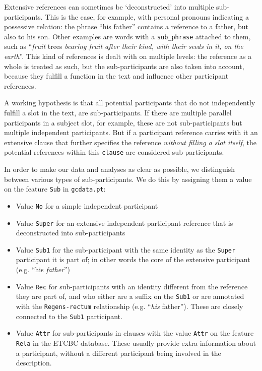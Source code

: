 \documentclass{report}
\newcommand{\mi}[1]{\lstinline{#1}}
\begin{document}
Extensive references can sometimes be `deconstructed' into multiple sub-participants. This is the case, for example, with personal pronouns indicating a possessive relation: the phrase ``his father'' contains a reference to a father, but also to his son. Other examples are words with a \mi{sub_phrase} attached to them, such as ``\emph{fruit} trees \emph{bearing fruit after their kind, with their seeds in it, on the earth}''. This kind of references is dealt with on multiple levels: the reference as a whole is treated as such, but the sub-participants are also taken into account, because they fulfill a function in the text and influence other participant references.

A working hypothesis is that all potential participants that do not independently fulfill a slot in the text, are sub-participants. If there are multiple parallel participants in a subject slot, for example, these are not sub-participants but multiple independent participants. But if a participant reference carries with it an extensive clause that further specifies the reference \emph{without filling a slot itself}, the potential references within this \mi{clause} are considered sub-participants.

In order to make our data and analyses as clear as possible, we distinguish between various types of sub-participants. We do this by assigning them a value on the feature \mi{Sub} in \mi{gcdata.pt}:
\begin{itemize}
\item Value \mi{No} for a simple independent participant
\item Value \mi{Super} for an extensive independent participant reference that is deconstructed into sub-participants
\item Value \mi{Sub1} for the sub-participant with the same identity as the \mi{Super} participant it is part of; in other words the core of the extensive participant (e.g. ``his \emph{father}'')
\item Value \mi{Rec} for sub-participants with an identity different from the reference they are part of, and who either are a suffix on the \mi{Sub1} or are annotated with the \mi{Regens-rectum} relationship (e.g. ``\emph{his} father''). These are closely connected to the \mi{Sub1} participant.
\item Value \mi{Attr} for sub-participants in clauses with the value \mi{Attr} on the feature \mi{Rela} in the ETCBC database. These usually provide extra information about a participant, without a different participant being involved in the description.
\end{itemize}
\end{document}
